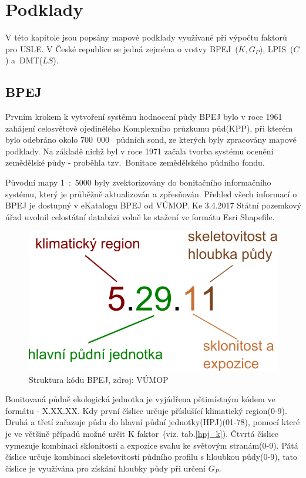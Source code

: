 \chapter{Podklady}
V této kapitole jsou popsány mapové podklady využívané při výpočtu 
faktorů pro USLE. V České republice se jedná zejména o vrstvy 
BPEJ~($K, G_P$), LPIS~($C$) a~DMT($LS$).
\section{BPEJ}
Prvním krokem k vytvoření systému hodnocení půdy BPEJ bylo v roce 1961
zahájení celosvětově ojedinělého Komplexního průzkumu půd(KPP), při
kterém bylo odebráno okolo 700~000~ půdních sond, ze kterých byly
zpracovány mapové podklady. Na základě nichž byl v roce 1971 začala
tvorba systému ocenění zemědělské půdy - proběhla tzv.~Bonitace
zemědělského půdního fondu.

Původní mapy 1~:~5000 byly zvektorizovány do bonitačního informačního
systému, který je průběžně aktualizován a zpřesňován. Přehled všech
informací o BPEJ je dostupný v eKatalogu BPEJ od
VÚMOP\cite{bpej_vumop}. Ke 3.4.2017 Státní pozemkový úřad uvolnil
celostátní databázi volně ke stažení ve formátu Esri Shapefile\cite{spucr}.
\begin{figure}[H]
    \centering
    \includegraphics[scale=0.5]{./pictures/Struktura_BPEJ.png}
      \caption[Struktura kódu BPEJ]{Struktura kódu BPEJ, zdroj:
        VÚMOP\cite{bpej_vumop}}
      \label{fig:struktura_bpej}
\end{figure}
Bonitovaná půdně ekologická jednotka je vyjádřena pětimístným kódem ve
formátu - X.XX.XX. Kdy první číslice určuje příslušící klimatický
region(0-9). Druhá a třetí zařazuje půdu do hlavní půdní
jednotky(HPJ)(01-78), pomocí které je ve většině případů možné určit K
faktor~(viz. tab.\ref{hpj_k}). Čtvrtá číslice vymezuje kombinaci
sklonitosti a expozice svahu ke světovým stranám(0-9). Pátá číslice
určuje kombinaci skeletovitosti půdního profilu s hloubkou půdy(0-9),
tato číslice je využívána pro získání hloubky půdy při určení
$G_P$.\cite{Novotny2013}
